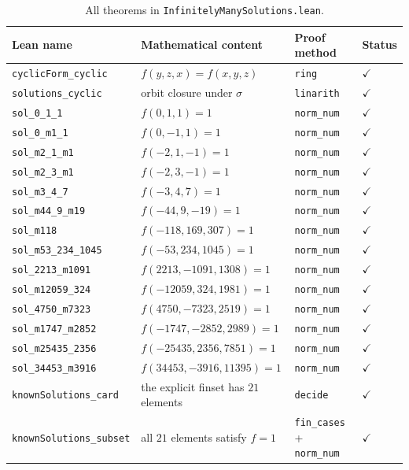 \documentclass[12pt,a4paper]{article}
\theoremstyle{definition}
\begin{document}
\begin{table}[h]
\centering
\caption{All theorems in \texttt{InfinitelyManySolutions.lean}.}
\label{tab:lean}
\begin{tabular}{p{5.0cm}p{5.0cm}p{2.2cm}p{1.5cm}}
\toprule
\textbf{Lean name} & \textbf{Mathematical content} & \textbf{Proof method} & \textbf{Status} \\
\midrule
\texttt{cyclicForm\_cyclic} & $f(y,z,x) = f(x,y,z)$ & \texttt{ring} & $\checkmark$ \\
\texttt{solutions\_cyclic} & orbit closure under $\sigma$ & \texttt{linarith} & $\checkmark$ \\
\texttt{sol\_0\_1\_1} & $f(0,1,1)=1$ & \texttt{norm\_num} & $\checkmark$ \\
\texttt{sol\_0\_m1\_1} & $f(0,-1,1)=1$ & \texttt{norm\_num} & $\checkmark$ \\
\texttt{sol\_m2\_1\_m1} & $f(-2,1,-1)=1$ & \texttt{norm\_num} & $\checkmark$ \\
\texttt{sol\_m2\_3\_m1} & $f(-2,3,-1)=1$ & \texttt{norm\_num} & $\checkmark$ \\
\texttt{sol\_m3\_4\_7} & $f(-3,4,7)=1$ & \texttt{norm\_num} & $\checkmark$ \\
\texttt{sol\_m44\_9\_m19} & $f(-44,9,-19)=1$ & \texttt{norm\_num} & $\checkmark$ \\
\texttt{sol\_m118} & $f(-118,169,307)=1$ & \texttt{norm\_num} & $\checkmark$ \\
\texttt{sol\_m53\_234\_1045} & $f(-53,234,1045)=1$ & \texttt{norm\_num} & $\checkmark$ \\
\texttt{sol\_2213\_m1091} & $f(2213,-1091,1308)=1$ & \texttt{norm\_num} & $\checkmark$ \\
\texttt{sol\_m12059\_324} & $f(-12059,324,1981)=1$ & \texttt{norm\_num} & $\checkmark$ \\
\texttt{sol\_4750\_m7323} & $f(4750,-7323,2519)=1$ & \texttt{norm\_num} & $\checkmark$ \\
\texttt{sol\_m1747\_m2852} & $f(-1747,-2852,2989)=1$ & \texttt{norm\_num} & $\checkmark$ \\
\texttt{sol\_m25435\_2356} & $f(-25435,2356,7851)=1$ & \texttt{norm\_num} & $\checkmark$ \\
\texttt{sol\_34453\_m3916} & $f(34453,-3916,11395)=1$ & \texttt{norm\_num} & $\checkmark$ \\
\texttt{knownSolutions\_card} & the explicit finset has $21$ elements & \texttt{decide} & $\checkmark$ \\
\texttt{knownSolutions\_subset} & all $21$ elements satisfy $f=1$ & \texttt{fin\_cases} + \texttt{norm\_num} & $\checkmark$ \\

\end{tabular}
\end{table}
\end{document}

